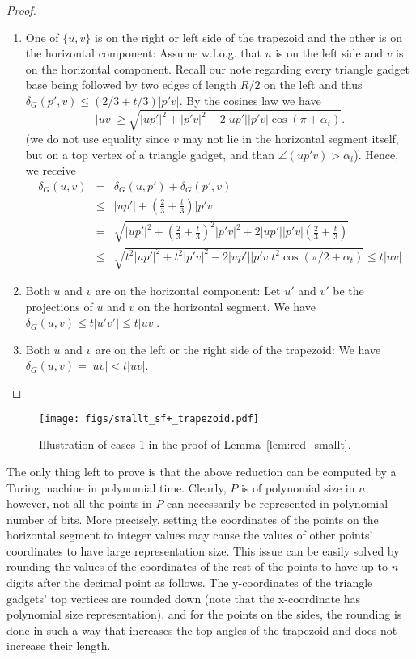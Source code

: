 \documentclass[a4paper]{llncs}
\begin{document}
\begin{proof}
\begin{enumerate}
\item One of $\{u,v\}$ is on the right or left side of the trapezoid 
and the other is on the horizontal component:
Assume w.l.o.g. that $u$ is on the left side and $v$ is on 
the horizontal component.
Recall our note regarding every triangle gadget base being
followed by two edges of length $R/2$ on the left and thus 
$\delta_G(p',v) \leq (2/3+t/3)|p'v|$.
By the cosines law we have 
$$|uv| \geq \sqrt{|up'|^2+|p'v|^2- 2|up'||p'v|\cos(\pi+\alpha_t)}.$$
(we do not use equality since $v$ may not lie in the horizontal segment itself, 
but on a top vertex of a triangle gadget,
and than $\angle(up'v)>\alpha_t$).
Hence, we receive
\begin{eqnarray*}
\delta_G(u,v) &=& \delta_G(u,p') + \delta_G(p',v)\\
							&\leq & |up'| + (\frac{2}{3}+\frac{t}{3})|p'v|\\
							&= & \sqrt{|up'|^2 + (\frac{2}{3}+\frac{t}{3})^2|p'v|^2 + 2|up'||p'v|(\frac{2}{3}+\frac{t}{3})}\\
							&\leq& \sqrt{t^2|up'|^2 + t^2|p'v|^2 - 2|up'||p'v|t^2\cos(\pi/2+\alpha_t)} \leq t|uv|						
\end{eqnarray*}


\item Both $u$ and $v$ are on the horizontal component:
Let $u'$ and $v'$ be the projections of $u$ and $v$ on the horizontal segment.
We have $\delta_G(u,v) \leq t|u'v'| \leq t|uv|$.


\item Both $u$ and $v$ are on the left or the right side of the trapezoid:
We have $\delta_G(u,v)=|uv| < t|uv|$.


\end{enumerate}

\end{proof}



\begin{figure}[htb]
    \centering
        \texttt{[image: figs/smallt\_sf+\_trapezoid.pdf]}
    \caption{Illustration of cases 1 in the proof of Lemma~\ref{lem:red_smallt}.}
    \label{fig:smallt_sf+}
\end{figure}


The only thing left to prove is that the above reduction can be computed 
by a Turing machine in polynomial time.
Clearly, $P$ is of polynomial size in $n$; however, not all the points in $P$ 
can necessarily be represented in 
polynomial number of bits.
More precisely, setting the coordinates of the points on the horizontal
segment to integer values may
cause the values of other points' coordinates to have large representation size.
This issue can be easily solved by rounding the values of the coordinates
of the rest of the points to have up to $n$ digits after the decimal point as follows.
The y-coordinates of the triangle gadgets' top vertices are rounded down
(note that the x-coordinate has polynomial size representation), 
and for the points on the sides, the rounding is done in such a way that
increases the top angles of the trapezoid and does not increase their length.
\end{document}
